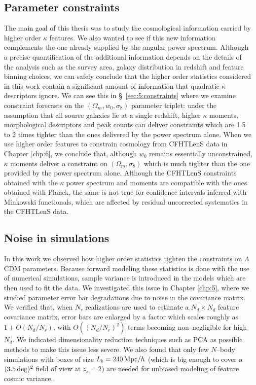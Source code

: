 \subsection{Parameter constraints}
The main goal of this thesis was to study the cosmological information carried by higher order $\kappa$ features. We also wanted to see if this new information complements the one already supplied by the angular power spectrum. Although a precise quantification of the additional information depends on the details of the analysis such as the survey area, galaxy distribution in redshift and feature binning choices, we can safely conclude that the higher order statistics considered in this work contain a significant amount of information that quadratic $\kappa$ descriptors ignore. We can see this in \S~\ref{sec:5:constraints} where we examine constraint forecasts on the $(\Omega_m,w_0,\sigma_8)$ parameter triplet: under the assumption that all source galaxies lie at a single redshift, higher $\kappa$ moments, morphological descriptors and peak counts can deliver constraints which are 1.5 to 2 times tighter than the ones delivered by the power spectrum alone. When we use higher order features to constrain cosmology from CFHTLenS data in Chapter \ref{chp:6}, we conclude that, although $w_0$ remains essentially unconstrained, $\kappa$ moments deliver a constraint on $(\Omega_m,\sigma_8)$ which is much tighter than the one provided by the power spectrum alone. Although the CFHTLenS constraints obtained with the $\kappa$ power spectrum and moments are compatible with the ones obtained with Planck, the same is not true for confidence intervals inferred with Minkowski functionals, which are affected by residual uncorrected systematics in the CFHTLenS data. 

\subsection{Noise in simulations}
In this work we observed how higher order statistics tighten the constraints on $\Lambda$CDM parameters. Because forward modeling these statistics is done with the use of numerical simulations, sample variance is introduced in the models which are then used to fit the data. We investigated this issue in Chapter \ref{chp:5}, where we studied parameter error bar degradations due to noise in the covariance matrix. We verified that, when $N_r$ realizations are used to estimate a $N_d\times N_d$ feature covariance matrix, error bars are enlarged by a factor which scales roughly as  $1+O(N_d/N_r)$, with $O((N_d/N_r)^2)$ terms becoming non--negligible for high $N_d$. We indicated dimensionality reduction techniques such as PCA as possible methods to make this issue less severe. We also found that only few $N$--body simulations with boxes of size $L_b=240\,{\rm Mpc}/h$ (which is big enough to cover a $(3.5\,{\rm deg})^2$ field of view at $z_s=2$) are needed for unbiased modeling of feature cosmic variance.  


